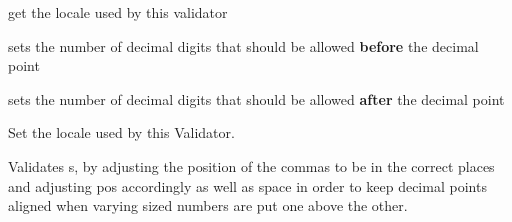 \documentclass[letterpaper,10pt,english]{sphinxmanual}
\begin{document}
\begin{fulllineitems}
\begin{fulllineitems}
\label{index:qsdn.QSDNNumericValidator.locale}
get the locale used by this validator

\end{fulllineitems}


\begin{fulllineitems}
\label{index:qsdn.QSDNNumericValidator.setDecamals}
sets the number of decimal digits that should be allowed \textbf{before} the decimal point

\end{fulllineitems}


\begin{fulllineitems}
\label{index:qsdn.QSDNNumericValidator.setDecimals}
sets the number of decimal digits that should be allowed \textbf{after} the decimal point

\end{fulllineitems}


\begin{fulllineitems}
\label{index:qsdn.QSDNNumericValidator.setLocale}
Set the locale used by this Validator.

\end{fulllineitems}


\begin{fulllineitems}
\label{index:qsdn.QSDNNumericValidator.validate}
Validates s, by adjusting the position of the commas to be in the correct places and adjusting pos accordingly as well as space in order to keep decimal points aligned when varying sized numbers are put one above the other.

\end{fulllineitems}


\end{fulllineitems}
\end{document}
